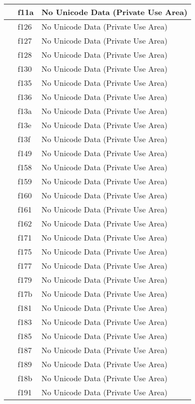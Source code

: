 \documentclass[12pt,letterpaper,openany]{book}
\begin{document}
\begin{center}
\begin{supertabular}{|m{0.25in}|m{0.5in}|m{4in}|}
 & f11a & No Unicode Data (Private Use Area)\\\hline
 & f126 & No Unicode Data (Private Use Area)\\\hline
 & f127 & No Unicode Data (Private Use Area)\\\hline
 & f128 & No Unicode Data (Private Use Area)\\\hline
 & f130 & No Unicode Data (Private Use Area)\\\hline
 & f135 & No Unicode Data (Private Use Area)\\\hline
 & f136 & No Unicode Data (Private Use Area)\\\hline
 & f13a & No Unicode Data (Private Use Area)\\\hline
 & f13e & No Unicode Data (Private Use Area)\\\hline
 & f13f & No Unicode Data (Private Use Area)\\\hline
 & f149 & No Unicode Data (Private Use Area)\\\hline
 & f158 & No Unicode Data (Private Use Area)\\\hline
 & f159 & No Unicode Data (Private Use Area)\\\hline
 & f160 & No Unicode Data (Private Use Area)\\\hline
 & f161 & No Unicode Data (Private Use Area)\\\hline
 & f162 & No Unicode Data (Private Use Area)\\\hline
 & f171 & No Unicode Data (Private Use Area)\\\hline
 & f175 & No Unicode Data (Private Use Area)\\\hline
 & f177 & No Unicode Data (Private Use Area)\\\hline
 & f179 & No Unicode Data (Private Use Area)\\\hline
 & f17b & No Unicode Data (Private Use Area)\\\hline
 & f181 & No Unicode Data (Private Use Area)\\\hline
 & f183 & No Unicode Data (Private Use Area)\\\hline
 & f185 & No Unicode Data (Private Use Area)\\\hline
 & f187 & No Unicode Data (Private Use Area)\\\hline
 & f189 & No Unicode Data (Private Use Area)\\\hline
 & f18b & No Unicode Data (Private Use Area)\\\hline
 & f191 & No Unicode Data (Private Use Area)\\\hline

\end{supertabular}
\end{center}
\end{document}
